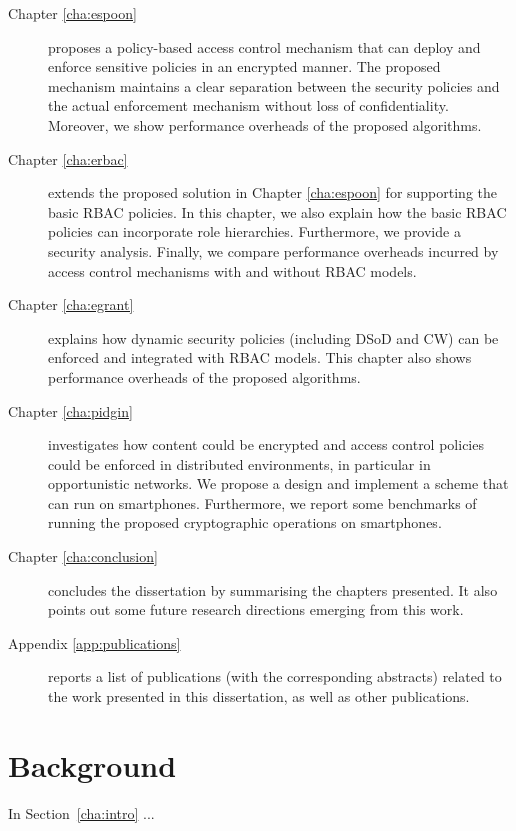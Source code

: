\documentclass[epsfig,a4paper,11pt,titlepage]{book}
\numberwithin{algorithm}{chapter}
\begin{document}
\begin{description}

	\item[Chapter \ref{cha:espoon}] proposes a policy-based access control mechanism that can deploy and enforce sensitive policies in an encrypted manner. The proposed mechanism maintains a clear separation between the security policies and the actual enforcement mechanism without loss of confidentiality. Moreover, we show performance overheads of the proposed algorithms.
	
	\item[Chapter \ref{cha:erbac}] extends the proposed solution in Chapter \ref{cha:espoon} for supporting the basic \gls{RBAC} policies. In this chapter, we also explain how the basic \gls{RBAC} policies can incorporate role hierarchies. Furthermore, we provide a security analysis. Finally, we compare performance overheads incurred by access control mechanisms with and without \gls{RBAC} models.
	
	\item[Chapter \ref{cha:egrant}] explains how dynamic security policies (including \acrlong{DSoD} and \acrlong{CW}) can be enforced and integrated with \gls{RBAC} models. This chapter also shows performance overheads of the proposed algorithms.
	
	\item[Chapter \ref{cha:pidgin}] investigates how content could be encrypted and access control policies could be enforced in distributed environments, in particular in opportunistic networks. We propose a design and implement a scheme that can run on smartphones. Furthermore, we report some benchmarks of running the proposed cryptographic operations on smartphones.
	
	\item[Chapter \ref{cha:conclusion}] concludes the dissertation by summarising the chapters presented. It also points out some future research directions emerging from this work.
	
	\item[Appendix \ref{app:publications}] reports a list of publications (with the corresponding abstracts) related to the work presented in this dissertation, as well as other publications.

\end{description}


\iffalse

\chapter{Background}
\label{cha:background}
In Section~\ref{cha:intro} ... 
\end{document}
